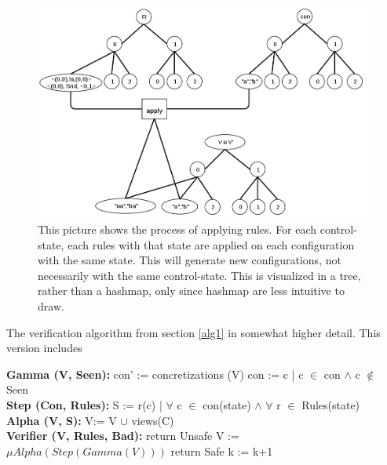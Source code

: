 \begin{figure}
\includegraphics[width=400pt] {bilder/applyrule.png}
\caption{This picture shows the process of applying rules. For each control-state, each rules with that state are applied on each configuration with the same state. This will generate new configurations, not necessarily with the same control-state. This is visualized in a tree, rather than a hashmap, only since hashmap are less intuitive to draw.}
\label{applyrule}
\end{figure}


\begin{algorithm}
  \caption{The verification algorithm from section \ref{alg1} in somewhat higher detail. This version includes }\label{euclid}
  \begin{algorithmic}[1]
    \State \textbf{Gamma (V, Seen):}
    \State \hspace{6 mm} con' := concretizations (V)
    \State \hspace{6 mm} con  := c | c $\in$ con $\land$ c $\notin$ Seen
    \\
    \State \textbf{Step (Con, Rules):}
    \State \hspace{6 mm} S := r(c) | $\forall$ c $\in$ con(state) $\land$ $\forall$ r $\in$ Rules(state)
    \EndFor
    \\
    \State \textbf{Alpha (V, S):}
    \State \hspace{6 mm} V:= V $\cup$ views(C)
    \\
    \State \textbf{Verifier (V, Rules, Bad):}
        \State return Unsafe
        \EndIf
        \State V := $\mu Alpha(Step(Gamma(V)))$
        \State return Safe
        \EndIf
        \State k := k+1
      \EndFor
\end{algorithmic}
\end{algorithm}

